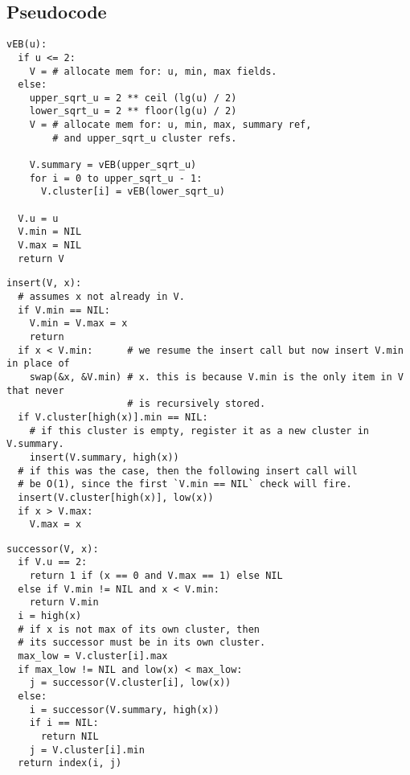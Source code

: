 \newpage
\subsection{Pseudocode}
\begin{verbatim}
vEB(u):
  if u <= 2:
    V = # allocate mem for: u, min, max fields.
  else:
    upper_sqrt_u = 2 ** ceil (lg(u) / 2)
    lower_sqrt_u = 2 ** floor(lg(u) / 2)
    V = # allocate mem for: u, min, max, summary ref,
        # and upper_sqrt_u cluster refs.

    V.summary = vEB(upper_sqrt_u)
    for i = 0 to upper_sqrt_u - 1:
      V.cluster[i] = vEB(lower_sqrt_u)

  V.u = u
  V.min = NIL
  V.max = NIL
  return V
\end{verbatim}

\begin{verbatim}
insert(V, x):
  # assumes x not already in V.
  if V.min == NIL:
    V.min = V.max = x
    return
  if x < V.min:      # we resume the insert call but now insert V.min in place of
    swap(&x, &V.min) # x. this is because V.min is the only item in V that never
                     # is recursively stored.
  if V.cluster[high(x)].min == NIL:
    # if this cluster is empty, register it as a new cluster in V.summary.
    insert(V.summary, high(x))
  # if this was the case, then the following insert call will
  # be O(1), since the first `V.min == NIL` check will fire.
  insert(V.cluster[high(x)], low(x))
  if x > V.max:
    V.max = x
\end{verbatim}

\newpage
\begin{verbatim}
successor(V, x):
  if V.u == 2:
    return 1 if (x == 0 and V.max == 1) else NIL
  else if V.min != NIL and x < V.min:
    return V.min
  i = high(x)
  # if x is not max of its own cluster, then
  # its successor must be in its own cluster.
  max_low = V.cluster[i].max 
  if max_low != NIL and low(x) < max_low:
    j = successor(V.cluster[i], low(x))
  else:
    i = successor(V.summary, high(x))
    if i == NIL:
      return NIL
    j = V.cluster[i].min
  return index(i, j)
\end{verbatim}

